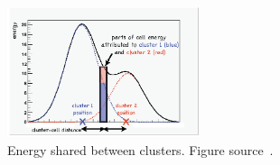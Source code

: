 \begin{figure}[t!]
\centering
\includegraphics[width=0.50\textwidth]{figures/energy_sharing.png}
\caption[Energy shared between clusters]{Energy shared between clusters. Figure source~\cite{}.}
\label{fig:clustering}
\end{figure}
